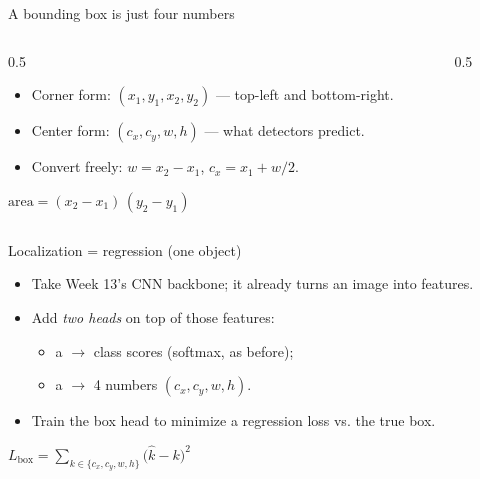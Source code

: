 \documentclass[10pt,aspectratio=169]{beamer}
\begin{document}
\begin{frame}{A bounding box is just four numbers}
  \begin{columns}[T]
    \begin{column}{0.5\textwidth}
      \begin{itemize}
        \item Corner form: $(x_1,y_1,x_2,y_2)$ --- top-left and bottom-right.
        \item Center form: $(c_x,c_y,w,h)$ --- what detectors predict.
        \item Convert freely: $w=x_2-x_1$, $c_x=x_1+w/2$.
      \end{itemize}
      \begin{mathbox}
        $\text{area}=(x_2-x_1)\,(y_2-y_1)$
      \end{mathbox}
    \end{column}
    \begin{column}{0.5\textwidth}
      \begin{center}
      \end{center}
    \end{column}
  \end{columns}
\end{frame}

\begin{frame}{Localization = regression (one object)}
  \begin{itemize}
    \item Take Week 13's CNN backbone; it already turns an image into features.
    \item Add \emph{two heads} on top of those features:
    \begin{itemize}
      \item a  $\rightarrow$ class scores (softmax, as before);
      \item a  $\rightarrow$ 4 numbers $(c_x,c_y,w,h)$.
    \end{itemize}
    \item Train the box head to minimize a regression loss vs. the true box.
  \end{itemize}
  \begin{mathbox}
    $\displaystyle L_{\text{box}}=\sum_{k\in\{c_x,c_y,w,h\}} \big(\hat{k}-k\big)^2$
  \end{mathbox}
\end{frame}
\end{document}
